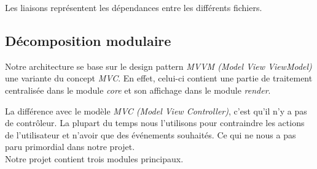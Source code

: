 ﻿\documentclass[17pts]{report}
\begin{document}
Les liaisons représentent les dépendances entre les différents fichiers.

\subsection{Décomposition modulaire}
\label{sub:Décomposition modulaire}
Notre architecture se base sur le design pattern \textit{MVVM (Model View
ViewModel)} une variante du concept \textit{MVC}. En effet, celui-ci contient
une partie de traitement centralisée dans le module \textit{core} et son
affichage dans le module \textit{render}.

La différence avec le modèle \textit{MVC (Model View Controller)}, c'est qu'il
n'y a pas de contrôleur.  La plupart du temps nous l'utilisons pour contraindre
les actions de l'utilisateur et n'avoir que des événements souhaités. Ce qui ne
nous a pas paru primordial dans notre projet.\\
Notre projet contient trois modules principaux.
\end{document}
